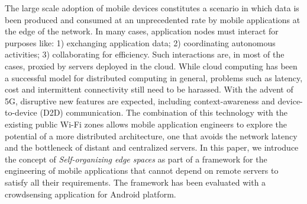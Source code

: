 The large scale adoption of mobile devices constitutes a scenario in which data is been produced and consumed at an unprecedented rate by mobile applications at the edge of the network. In many cases, application nodes must interact for purposes like: 1) exchanging application data; 2) coordinating autonomous activities; 3) collaborating for efficiency. Such interactions are, in most of the cases, proxied by servers deployed in the cloud. While cloud computing has been a successful model for distributed computing in general, problems such as latency, cost and intermittent connectivity still need to be harassed. With the advent of 5G, disruptive new features are expected, including context-awareness and device-to-device (D2D) communication. The combination of this technology with the existing public Wi-Fi zones allows mobile application engineers to explore the potential of a more distributed architecture, one that avoids the network latency and the bottleneck of distant and centralized servers. In this paper, we introduce the concept of \textit{Self-organizing edge spaces} as part of a framework for the engineering of mobile applications that cannot depend on remote servers to satisfy all their requirements. 
The framework has been evaluated with a crowdsensing application for Android platform.



